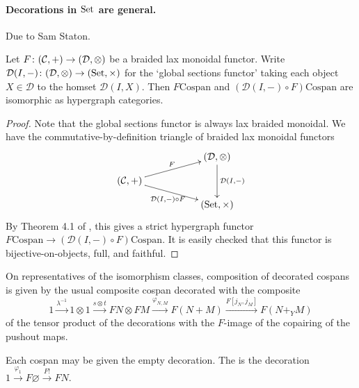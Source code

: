 \paragraph{Decorations in $\mathrm{Set}$ are general.} \label{ssec.setdecorations}

Due to Sam Staton.

\begin{proposition} \label{prop.setdecorations}
  Let $F{\colon} (\mathcal C, +) \to (\mathcal D, \otimes)$ be a braided lax monoidal
  functor. Write $\mathcal D(I,-){\colon} (\mathcal D, \otimes) \to (\mathrm{Set},
  \times)$ for the `global sections functor' taking each object $X \in \mathcal
  D$ to the homset $\mathcal D(I,X)$. Then $F\mathrm{Cospan}$ and $(\mathcal
  D(I,-)\circ F)\mathrm{Cospan}$ are isomorphic as hypergraph categories.
\end{proposition}
\begin{proof}
  Note that the global sections functor is always lax braided monoidal. We have
  the commutative-by-definition triangle of braided lax monoidal functors
  \[
    \xymatrixrowsep{2ex}
    \xymatrix{
      && (\mathcal D,\otimes) \ar[dd]^{\mathcal D(I,-)} \\
      (\mathcal C,+) \ar[urr]^{F} \ar[drr]_{\mathcal D(I,-)\circ F} \\
      && (\Set, \times)
    }
  \]
  By Theorem 4.1 of \cite{F}, this gives a strict hypergraph functor
  $F\mathrm{Cospan} \to (\mathcal D(I,-)\circ F)\mathrm{Cospan}$. It is easily
  checked that this functor is bijective-on-objects, full, and faithful.
\end{proof}


On representatives of the isomorphism classes, composition of decorated
cospans is given by the usual composite cospan decorated with the composite
\[
  1 \stackrel{\lambda^{-1}}\longrightarrow 1 \otimes 1 \stackrel{s \otimes
  t}\longrightarrow FN \otimes FM \stackrel{\varphi_{N,M}}\longrightarrow
  F(N+M) \stackrel{F[j_N,j_M]}\longrightarrow F(N+_YM)
\]
of the tensor product of the decorations with the $F$-image of the copairing
of the pushout maps.

Each cospan may be given the empty decoration. The  is the
decoration $1 \stackrel{\varphi_1}{\rightarrow} F\varnothing
\stackrel{F!}{\rightarrow} FN$.


